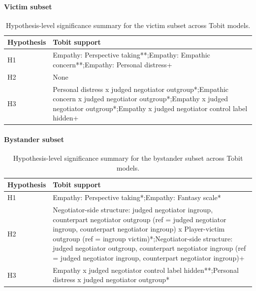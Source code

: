 \documentclass[11pt]{article}
\begin{document}
\paragraph{Victim subset}
\begin{table}[H]
\centering
\small
\renewcommand{\arraystretch}{1.15}
\caption{Hypothesis-level significance summary for the victim subset across Tobit models.}
\label{tab:hypothesis_summary_victim}
\begin{tabular}{>{\raggedright\arraybackslash}p{}>{\raggedright\arraybackslash}p{}}
\toprule
Hypothesis & Tobit support \\
\midrule
H1 & Empathy: Perspective taking**;\newline Empathy: Empathic concern**;\newline Empathy: Personal distress+ \\
H2 & None \\
H3 & Personal distress x judged negotiator outgroup*;\newline Empathic concern x judged negotiator outgroup*;\newline Empathy x judged negotiator outgroup*;\newline Empathy x judged negotiator control label hidden+ \\
\bottomrule
\end{tabular}
\end{table}

\paragraph{Bystander subset}
\begin{table}[H]
\centering
\small
\renewcommand{\arraystretch}{1.15}
\caption{Hypothesis-level significance summary for the bystander subset across Tobit models.}
\label{tab:hypothesis_summary_bystander}
\begin{tabular}{>{\raggedright\arraybackslash}p{}>{\raggedright\arraybackslash}p{}}
\toprule
Hypothesis & Tobit support \\
\midrule
H1 & Empathy: Perspective taking*;\newline Empathy: Fantasy scale* \\
H2 & Negotiator-side structure: judged negotiator ingroup, counterpart negotiator outgroup (ref = judged negotiator ingroup, counterpart negotiator ingroup) x Player-victim outgroup (ref = ingroup victim)*;\newline Negotiator-side structure: judged negotiator outgroup, counterpart negotiator ingroup (ref = judged negotiator ingroup, counterpart negotiator ingroup)+ \\
H3 & Empathy x judged negotiator control label hidden**;\newline Personal distress x judged negotiator outgroup* \\
\bottomrule
\end{tabular}
\end{table}
\end{document}
